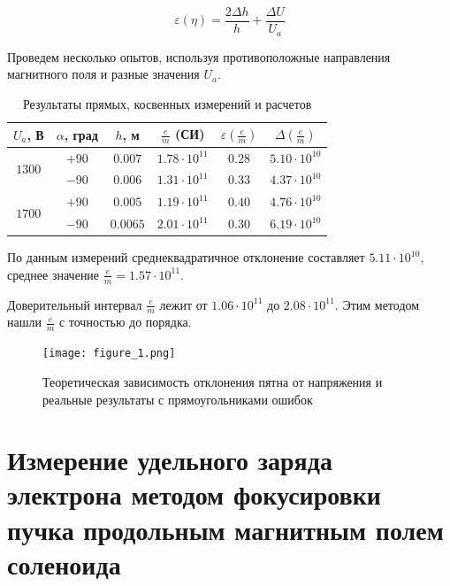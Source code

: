 \begin{equation}
	\varepsilon{(\eta)}=\frac{2\Delta{h}}{h}+\frac{\Delta{U}}{U_a}
\end{equation}

Проведем несколько опытов, используя противоположные направления магнитного поля и разные значения $U_a$.

\begin{table}[h]
\begin{center}
\begin{tabular}{|c|c|c|c|c|c|}

\hline
$U_a$, В & $\alpha$, град & $h$, м & $\frac{e}{m}$ (СИ) & $\varepsilon{(\frac{e}{m})}$ & $\Delta{(\frac{e}{m})}$\\
\hline
\multirow{2}{*}{$1300$} & $+90$ & $0.007$ & $1.78\cdot10^{11}$ & $0.28$ & $5.10\cdot10^{10}$ \\ 

\cline{2-6}
						& $-90$ & $0.006$ & $1.31\cdot10^{11}$ & $0.33$ & $4.37\cdot10^{10}$ \\ \hline
\multirow{2}{*}{$1700$} & $+90$ & $0.005$ & $1.19\cdot10^{11}$ & $0.40$ & $4.76\cdot10^{10}$ \\
\cline{2-6}
						& $-90$ &$0.0065$ & $2.01\cdot10^{11}$ & $0.30$ & $6.19\cdot10^{10}$ \\ \hline

\end{tabular}
\end{center}
\caption{\label{tab:ex_1}Результаты прямых, косвенных измерений и расчетов}
\end{table} 

По данным измерений среднеквадратичное отклонение составляет $5.11\cdot10^{10}$, среднее значение $\frac{e}{m}=1.57\cdot10^{11}$.

Доверительный интервал $\frac{e}{m}$ лежит от $1.06\cdot10^{11}$ до $2.08\cdot10^{11}$. Этим методом нашли $\frac{e}{m}$ с точностью до порядка.

\begin{figure}[ht!]
	\centering
	\texttt{[image: figure\_1.png]}
	\caption{Теоретическая зависимость отклонения пятна от напряжения и реальные результаты с прямоугольниками ошибок}
	\label{fig:figure1}
\end{figure}


\section{Измерение удельного заряда электрона методом фокусировки пучка продольным магнитным полем соленоида}

